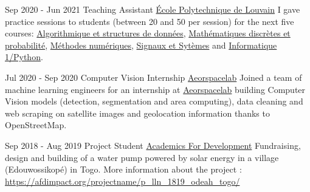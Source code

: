 \begin{paracol}{2}
\begin{rightcolumn}
\cvevent 
 	{Sep 2020 - Jun 2021}
    {Teaching Assistant}
    {\href{https://uclouvain.be/en/faculties/epl}{École Polytechnique de Louvain}}
    {
        I gave practice sessions to students (between 20 and 50 per session) for the next five courses: 
        \href{https://sites.uclouvain.be/archives-portail/cdc2020/en-cours-2020-linfo1121}{Algorithmique et structures de données},
         \href{https://sites.uclouvain.be/archives-portail/cdc2020/en-cours-2020-lepl1108}{Mathématiques discrètes et probabilité},
         \href{https://sites.uclouvain.be/archives-portail/cdc2020/en-cours-2020-lepl1104}{Méthodes numériques},
         \href{https://sites.uclouvain.be/archives-portail/cdc2020/en-cours-2020-lepl1106}{Signaux et Sytèmes} and
         \href{https://sites.uclouvain.be/archives-portail/cdc2020/en-cours-2020-lepl1401}{Informatique 1/Python}.
    }   
	{}
	{}
	{}

\cvevent
	{Jul 2020 - Sep 2020}
	{Computer Vision Internship}
	{\href{https://www.aerospacelab.be/}{Aeorspacelab}}
    {Joined a team of machine learning engineers for an internship at \href{https://www.aerospacelab.be/}{Aeorspacelab} building Computer Vision models (detection, segmentation and area computing), data cleaning and web scraping on satellite images and geolocation information thanks to OpenStreetMap.}
	{}
	{}
	{}


\cvevent 
 	{Sep 2018 - Aug 2019}
    {Project Student}
    {\href{https://afdimpact.org}{Academics For Development}}
    {
        Fundraising, design and building of a water pump powered by solar energy in a village (Edouwossikopé) in Togo.
         More information about the project : \url{https://afdimpact.org/projectname/p\_lln\_1819\_odeah\_togo/}
    }   
	{}
	{}
	{}

\vfill
\end{rightcolumn}
\end{paracol}

